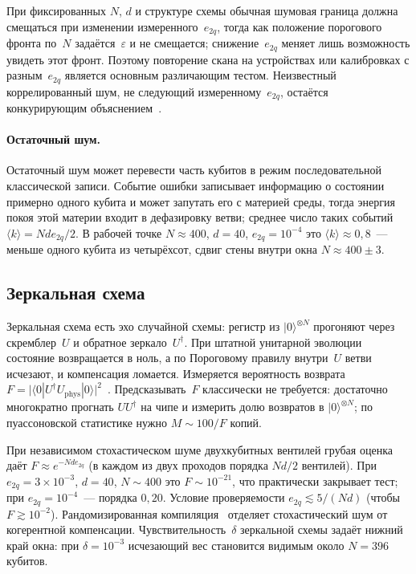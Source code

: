 \documentclass[11pt,a4paper]{article}
\newcommand{\CollapseRuleD}{Пороговому правилу}
\begin{document}
При фиксированных $N$, $d$ и структуре схемы обычная шумовая граница должна смещаться при изменении измеренного~$e_{2q}$, тогда как положение порогового фронта по~$N$ задаётся~$\varepsilon$ и не смещается; снижение~$e_{2q}$ меняет лишь возможность увидеть этот фронт. Поэтому повторение скана на устройствах или калибровках с разным~$e_{2q}$ является основным различающим тестом. Неизвестный коррелированный шум, не следующий измеренному~$e_{2q}$, остаётся конкурирующим объяснением~\cite{kalai2016,rinott2022}.

\paragraph{Остаточный шум.}
Остаточный шум может перевести часть кубитов в режим последовательной классической записи. Событие ошибки записывает информацию о состоянии примерно одного кубита и может запутать его с материей среды, тогда энергия покоя этой материи входит в дефазировку ветви; среднее число таких событий $\langle k\rangle = N d e_{2q}/2$. В рабочей точке $N\approx400$, $d=40$, $e_{2q}=10^{-4}$ это $\langle k\rangle\approx0{,}8$~--- меньше одного кубита из четырёхсот, сдвиг стены внутри окна $N\approx400\pm3$.

\subsection{Зеркальная схема}
\label{sec:mirror}

Зеркальная схема есть эхо случайной схемы: регистр из $|0\rangle^{\otimes N}$ прогоняют через скремблер~$U$ и обратное зеркало~$U^\dagger$. При штатной унитарной эволюции состояние возвращается в ноль, а по \CollapseRuleD{} внутри~$U$ ветви исчезают, и компенсация ломается. Измеряется вероятность возврата $F=\bigl|\langle 0|U^\dagger U_{\mathrm{phys}}|0\rangle\bigr|^2$~\cite{swingle2018}. Предсказывать~$F$ классически не требуется: достаточно многократно прогнать $U U^\dagger$ на чипе и измерить долю возвратов в $|0\rangle^{\otimes N}$; по пуассоновской статистике нужно $M\sim 100/F$ копий.

При независимом стохастическом шуме двухкубитных вентилей грубая оценка даёт $F\approx e^{-N d e_{2q}}$ (в каждом из двух проходов порядка $N d/2$ вентилей). При $e_{2q}=3\times 10^{-3}$, $d=40$, $N\sim400$ это $F\sim10^{-21}$, что практически закрывает тест; при $e_{2q}=10^{-4}$~--- порядка $0{,}20$. Условие проверяемости $e_{2q}\lesssim 5/(N d)$ (чтобы $F\gtrsim10^{-2}$). Рандомизированная компиляция~\cite{wallman2016} отделяет стохастический шум от когерентной компенсации. Чувствительность~$\delta$ зеркальной схемы задаёт нижний край окна: при $\delta=10^{-3}$ исчезающий вес становится видимым около $N=396$ кубитов.
\end{document}
